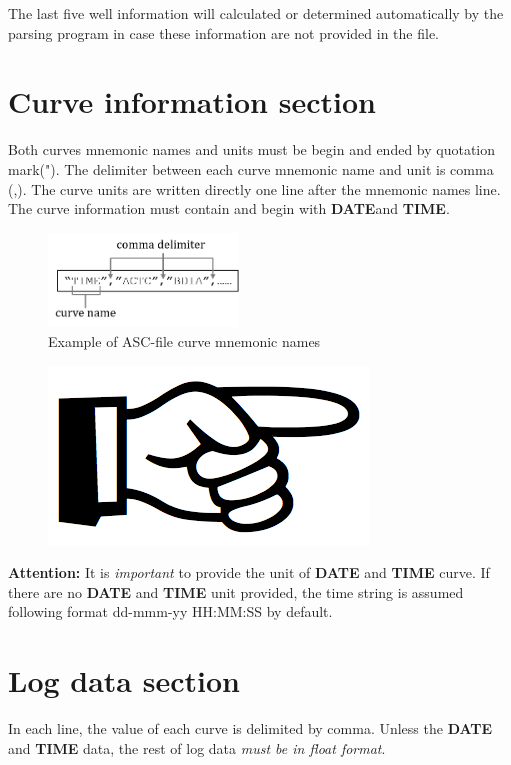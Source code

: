 \documentclass[12pt,a4paper,oneside]{report}
\begin{document}
\begin{appendices}
\noindent The last five well information will calculated or determined automatically by the parsing program in case these information are not provided in the file. 


\section{Curve information section}
Both curves mnemonic names and units must be begin and ended by quotation mark("). The delimiter between each curve mnemonic name and unit is comma (,). The curve units are written directly one line after the mnemonic names line. The curve information must contain and begin with \textbf{DATE}and \textbf{TIME}.
\begin{figure}[ht]
\centering
\includegraphics[width=0.45\textwidth]{fig/asc_curve_info_1.png}
\caption{Example of ASC-file curve mnemonic names}
\end{figure}

\begin{figure}
\vspace{-15pt}
\includegraphics[scale=0.08]{fig/hand_point.png}
\end{figure}
\noindent\textbf{Attention:} It is \emph{important} to provide the unit of \textbf{DATE} and \textbf{TIME} curve. If there are no \textbf{DATE} and \textbf{TIME} unit provided, the time string is assumed following format {\color{violet}dd-mmm-yy HH:MM:SS} by default.


\section{Log data section}
In each line, the value of each curve is delimited by comma. Unless the \textbf{DATE} and \textbf{TIME} data, the rest of log data \emph{must be in float format}.


\end{appendices}
\end{document}
